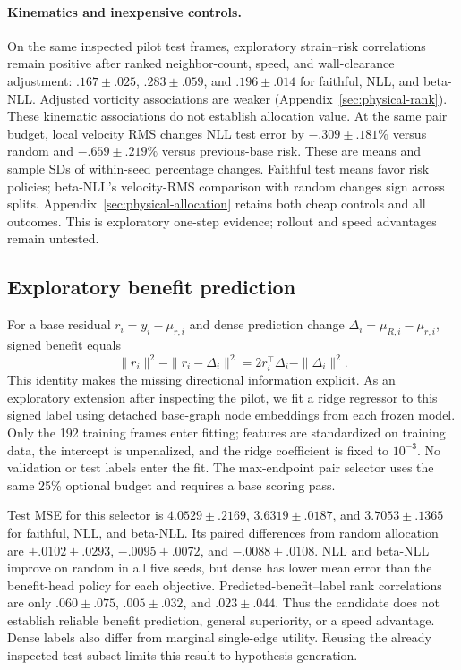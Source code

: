 \paragraph{Kinematics and inexpensive controls.}
On the same inspected pilot test frames, exploratory strain--risk correlations remain positive after ranked neighbor-count, speed, and wall-clearance adjustment: $.167\pm.025$, $.283\pm.059$, and $.196\pm.014$ for faithful, NLL, and beta-NLL. Adjusted vorticity associations are weaker (Appendix~\ref{sec:physical-rank}). These kinematic associations do not establish allocation value. At the same pair budget, local velocity RMS changes NLL test error by $-.309\pm.181\%$ versus random and $-.659\pm.219\%$ versus previous-base risk. These are means and sample SDs of within-seed percentage changes. Faithful test means favor risk policies; beta-NLL's velocity-RMS comparison with random changes sign across splits. Appendix~\ref{sec:physical-allocation} retains both cheap controls and all outcomes. This is exploratory one-step evidence; rollout and speed advantages remain untested.

\subsection{Exploratory benefit prediction}
For a base residual $r_i=y_i-\mu_{r,i}$ and dense prediction change $\Delta_i=\mu_{R,i}-\mu_{r,i}$, signed benefit equals
\begin{equation}
 \|r_i\|^2-\|r_i-\Delta_i\|^2
 =2r_i^\top\Delta_i-\|\Delta_i\|^2.
\end{equation}
This identity makes the missing directional information explicit. As an exploratory extension after inspecting the pilot, we fit a ridge regressor to this signed label using detached base-graph node embeddings from each frozen model. Only the 192 training frames enter fitting; features are standardized on training data, the intercept is unpenalized, and the ridge coefficient is fixed to $10^{-3}$. No validation or test labels enter the fit. The max-endpoint pair selector uses the same 25\% optional budget and requires a base scoring pass.

Test MSE for this selector is $4.0529\pm.2169$, $3.6319\pm.0187$, and $3.7053\pm.1365$ for faithful, NLL, and beta-NLL. Its paired differences from random allocation are $+.0102\pm.0293$, $-.0095\pm.0072$, and $-.0088\pm.0108$. NLL and beta-NLL improve on random in all five seeds, but dense has lower mean error than the benefit-head policy for each objective. Predicted-benefit--label rank correlations are only $.060\pm.075$, $.005\pm.032$, and $.023\pm.044$. Thus the candidate does not establish reliable benefit prediction, general superiority, or a speed advantage. Dense labels also differ from marginal single-edge utility. Reusing the already inspected test subset limits this result to hypothesis generation.

